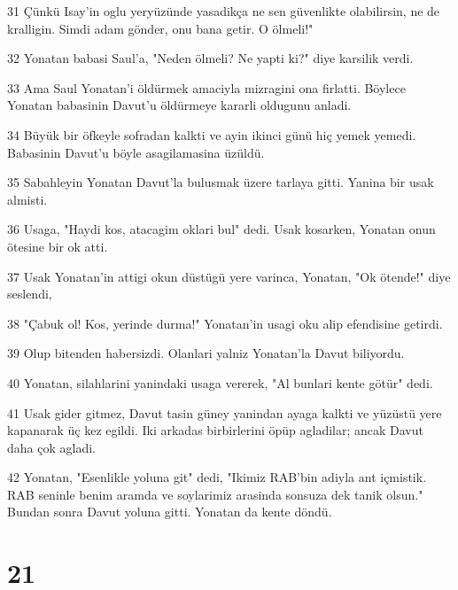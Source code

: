 \par 31 Çünkü Isay'in oglu yeryüzünde yasadikça ne sen güvenlikte olabilirsin, ne de kralligin. Simdi adam gönder, onu bana getir. O ölmeli!"
\par 32 Yonatan babasi Saul'a, "Neden ölmeli? Ne yapti ki?" diye karsilik verdi.
\par 33 Ama Saul Yonatan'i öldürmek amaciyla mizragini ona firlatti. Böylece Yonatan babasinin Davut'u öldürmeye kararli oldugunu anladi.
\par 34 Büyük bir öfkeyle sofradan kalkti ve ayin ikinci günü hiç yemek yemedi. Babasinin Davut'u böyle asagilamasina üzüldü.
\par 35 Sabahleyin Yonatan Davut'la bulusmak üzere tarlaya gitti. Yanina bir usak almisti.
\par 36 Usaga, "Haydi kos, atacagim oklari bul" dedi. Usak kosarken, Yonatan onun ötesine bir ok atti.
\par 37 Usak Yonatan'in attigi okun düstügü yere varinca, Yonatan, "Ok ötende!" diye seslendi,
\par 38 "Çabuk ol! Kos, yerinde durma!" Yonatan'in usagi oku alip efendisine getirdi.
\par 39 Olup bitenden habersizdi. Olanlari yalniz Yonatan'la Davut biliyordu.
\par 40 Yonatan, silahlarini yanindaki usaga vererek, "Al bunlari kente götür" dedi.
\par 41 Usak gider gitmez, Davut tasin güney yanindan ayaga kalkti ve yüzüstü yere kapanarak üç kez egildi. Iki arkadas birbirlerini öpüp agladilar; ancak Davut daha çok agladi.
\par 42 Yonatan, "Esenlikle yoluna git" dedi, "Ikimiz RAB'bin adiyla ant içmistik. RAB seninle benim aramda ve soylarimiz arasinda sonsuza dek tanik olsun." Bundan sonra Davut yoluna gitti. Yonatan da kente döndü.

\chapter{21}

